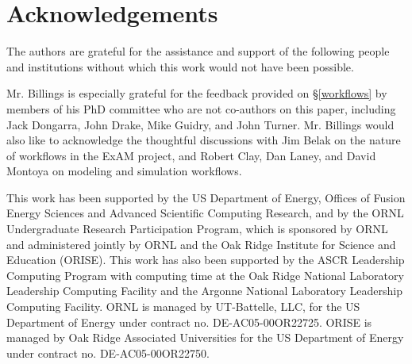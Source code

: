 \section{Acknowledgements} The authors are grateful for the assistance and
support of the following people and institutions without which this work would
not have been possible.

Mr. Billings is especially grateful for the feedback provided on
\S\ref{workflows} by members of his PhD committee who are not co-authors on this
paper, including Jack Dongarra, John Drake, Mike Guidry, and John Turner. Mr.
Billings would also like to acknowledge the thoughtful discussions with Jim
Belak on the nature of workflows in the ExAM project, and Robert Clay, Dan
Laney, and David Montoya on modeling and simulation workflows.

This work has been supported by the US Department of Energy, Offices of Fusion
Energy Sciences and Advanced Scientific Computing Research, and by the ORNL
Undergraduate Research Participation Program, which is sponsored by ORNL and
administered jointly by ORNL and the Oak Ridge Institute for Science and
Education (ORISE). This work has also been supported by the ASCR Leadership
Computing Program with computing time at the Oak Ridge National Laboratory
Leadership Computing Facility and the Argonne National Laboratory Leadership
Computing Facility. ORNL is managed by UT-Battelle, LLC, for the US Department
of Energy under contract no. DE-AC05-00OR22725. ORISE is managed by Oak Ridge
Associated Universities for the US Department of Energy under contract no.
DE-AC05-00OR22750.
